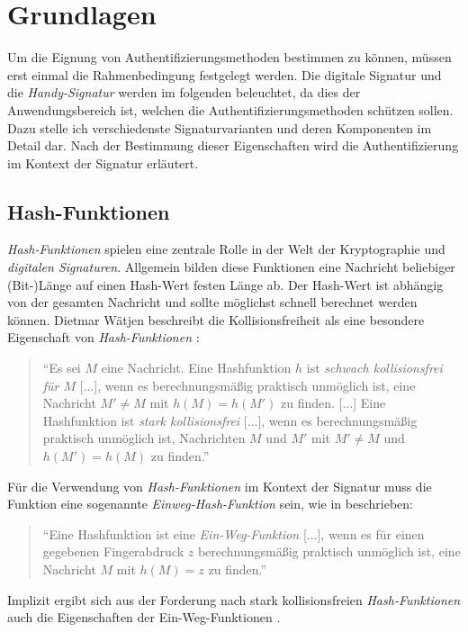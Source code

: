 \documentclass[11pt,a4paper,ngerman]{scrreprt}
\begin{document}
\chapter{Grundlagen}
Um die Eignung von Authentifizierungsmethoden bestimmen zu können, müssen erst einmal die Rahmenbedingung festgelegt werden. Die digitale Signatur und die \textit{Handy-Signatur} werden im folgenden beleuchtet, da dies der Anwendungsbereich ist, welchen die Authentifizierungsmethoden schützen sollen. Dazu stelle ich verschiedenste Signaturvarianten und deren Komponenten im Detail dar. Nach der Bestimmung dieser Eigenschaften wird die Authentifizierung im Kontext der Signatur erläutert.

\section{Hash-Funktionen}\label{sec:Hash-Funktionen}
\textit{Hash-Funktionen} spielen eine zentrale Rolle in der Welt der Kryptographie und \textit{digitalen Signaturen}. Allgemein bilden diese Funktionen eine Nachricht beliebiger (Bit-)Länge auf einen Hash-Wert festen Länge ab. Der Hash-Wert ist abhängig von der gesamten Nachricht und sollte möglichst schnell berechnet werden können. Dietmar Wätjen beschreibt die Kollisionsfreiheit als eine besondere Eigenschaft von \textit{Hash-Funktionen} \cite[S. 89]{krypt08}: 
\begin{quote}
    ``Es sei $M$ eine Nachricht. Eine Hashfunktion $h$ ist \emph{schwach kollisionsfrei für $M$} [...], wenn es berechnungsmäßig praktisch unmöglich ist, eine Nachricht $M' \neq M$ mit $h(M) = h(M')$ zu finden. [...]
    Eine Hashfunktion ist \emph{stark kollisionsfrei} [...], wenn es berechnungsmäßig praktisch unmöglich ist, Nachrichten $M$ und $M'$ mit $M' \neq M$ und $h(M') = h(M)$ zu finden.''
\end{quote}
Für die Verwendung von \emph{Hash-Funktionen} im Kontext der Signatur muss die Funktion eine sogenannte \emph{Einweg-Hash-Funktion} sein, wie in \cite[S. 99]{krypt08} beschrieben:
\begin{quote}
    ``Eine Hashfunktion ist eine \emph{Ein-Weg-Funktion} [...], wenn es für einen gegebenen Fingerabdruck $z$ berechnungsmäßig praktisch unmöglich ist, eine Nachricht $M$ mit $h(M)=z$ zu finden.''
\end{quote}
Implizit ergibt sich aus der Forderung nach stark kollisionsfreien \textit{Hash-Funktionen} auch die Eigenschaften der Ein-Weg-Funktionen \cite[S. 99]{krypt08}.
\end{document}
